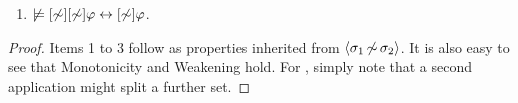 \begin{proposition}
\begin{enumerate}

\item\label{itm:idemparef} $\not\models [\not\sim][\not\sim]\varphi \leftrightarrow [\not\sim]\varphi$.
\end{enumerate}
\end{proposition}

\begin{proof}
Items 1 to 3 follow as properties inherited from $\langle \sigma_1{\,\not\sim\,}\sigma_2 \rangle$. 
It is also easy to see that Monotonicity and Weakening hold. For , simply note that a second application might split a further set.%

\end{proof}
